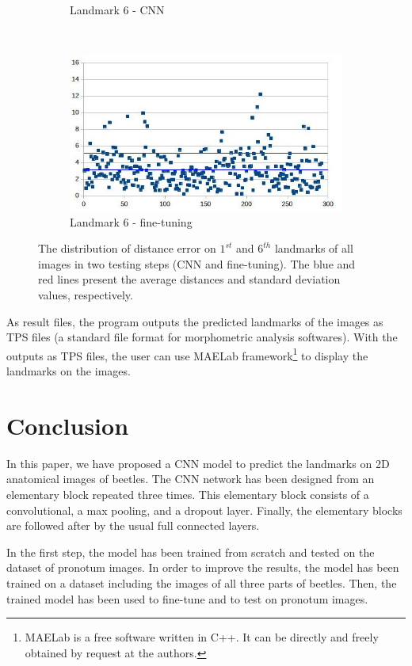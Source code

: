 \documentclass[10pt]{article}
\begin{document}
\begin{figure}[htbp]
\begin{subfigure}[t]{0.25\textwidth}
        \caption{\small{Landmark 6 - CNN}}
        \label{figsub111}
    \end{subfigure}%
    ~ 
    \begin{subfigure}[t]{0.25\textwidth}
        \centering
        \includegraphics[scale=.32]{images/lm6_finetuning_2}
        \caption{\small{Landmark 6 - fine-tuning}}
        \label{figsub222}
    \end{subfigure}
    \caption{\small{The distribution of distance error on $1^{st}$ and $6^{th}$ landmarks of all images in two testing steps (CNN and fine-tuning). The blue and red lines present the average distances and standard deviation values, respectively.}}
    \label{figrsexample2}
\end{figure}

As result files, the program outputs the
predicted landmarks of the images as TPS files (a standard file format for morphometric analysis softwares). With the outputs as TPS files,
the user can use MAELab framework\footnote{MAELab is a free software written in C++. It can be directly and freely
obtained by request at the authors.} to display the
landmarks on the images.
\section{Conclusion}
In this paper, we have proposed a CNN model to predict the landmarks on 2D anatomical images of beetles. The CNN network has been designed from an elementary block repeated three times. This elementary block consists of a convolutional, a max pooling, and a dropout layer. Finally, the elementary blocks are followed after by the usual full connected layers.

In the first step, the model has been trained from scratch and tested on the dataset of pronotum images. In order to improve the results, the model has been trained on a dataset including the images of all three parts of beetles. Then, the trained model has been used to fine-tune and to test on pronotum images.
\end{document}
